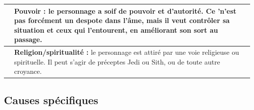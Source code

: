 \documentclass[twoside]{article}
\begin{document}
\begin{table}[h]
\begin{tabular}{|m{2cm}|m{13cm}|}
		\hline
		\centering{81 -- 90} & \textbf{Pouvoir :} le personnage a soif de pouvoir et d'autorité. Ce 'n'est pas forcément un despote dans l'âme, mais il veut contrôler sa situation et ceux qui l'entourent, en améliorant son sort au passage. \\
		\hline
		\centering{91 -- 00} & \textbf{Religion/spiritualité :} le personnage est attiré par une voie religieuse ou spirituelle. Il peut s'agir de préceptes Jedi ou Sith, ou de toute autre croyance. \\
		\hline
	\end{tabular}
\end{table}


	
\subsection*{Causes spécifiques}
\end{document}
